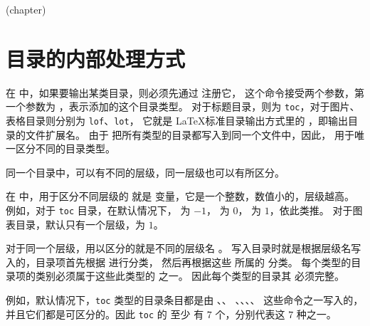 \documentclass[twoside]{book}
\def\xampletext{\par}
\def\xampleprint{\xamplecode \xampleline \xampletext}
\begin{document}
\begin{xample}
\begingroup 
{}
  {}{\startmulticolumns[ragged,outer-sep=0pt,
      heading={{\centering\Large\bfseries\tocthename\par}}]}
  {}
  {\stopmulticolumns}{}
  {\begin{description}}
  {}
  {\tocifcomplement{\item[\rule{1ex}{1ex}]\rule{1ex}{1ex}\par}
    {\item[\tocifnumbered{\tocthenumber}{\rule{1ex}{1ex}}]
      \tocthename\quad\toclink{\tocthepage}\par}}
  {}
  {\end{description}}
\localspecifiedtoc(chapter)
\endgroup
\stopxamplecode
\xampleprint
\end{xample}


\section{目录的内部处理方式}

在 \CusTeX 中，如果要输出某类目录，则必须先通过  注册它，
这个命令接受两个参数，第一个参数为 ，表示添加的这个目录类型。
对于标题目录，则为 \texttt{toc}，对于图片、表格目录则分别为 \texttt{lof}、\texttt{lot}，
它就是 \LaTeX 标准目录输出方式里的 ，即输出目录的文件扩展名。
由于 \CusTeX 把所有类型的目录都写入到同一个文件中，因此， 
用于唯一区分不同的目录类型。

同一个目录中，可以有不同的层级，同一层级也可以有所区分。

在 \CusTeX 中，用于区分不同层级的
就是  变量，它是一个整数，数值小的，层级越高。
例如，对于 \texttt{toc} 目录，在默认情况下， 为 $-1$， 为 $0$，
 为 $1$，依此类推。
对于图表目录，默认只有一个层级，为 $1$。

对于同一个层级，用以区分的就是不同的层级名 。
写入目录时就是根据层级名写入的，目录项首先根据  进行分类，
然后再根据这些  所属的  分类。
每个类型的目录项的类别必须属于这些此类型的  之一。
因此每个类型的目录其  必须完整。

例如，默认情况下，\texttt{toc} 类型的目录条目都是由 、、
、、、、 
这些命令之一写入的，并且它们都是可区分的。因此 \texttt{toc} 的  至少
有 $7$ 个，分别代表这 $7$ 种之一。
\end{document}
